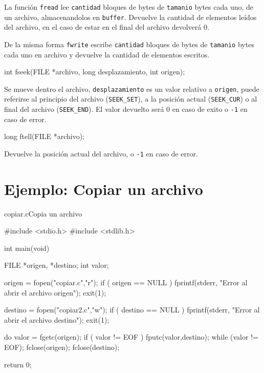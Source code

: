 La función \lstinline!fread! lee \lstinline!cantidad! bloques de bytes de
\lstinline!tamanio! bytes cada uno, de un archivo, almacenandolos en
\lstinline!buffer!. Devuelve la cantidad de elementos leídos del archivo, en
el caso de estar en el final del archivo devolverá 0.

De la misma forma \lstinline!fwrite! escribe \lstinline!cantidad! bloques de
bytes de \lstinline!tamanio! bytes cada uno en archivo y devuelve la cantidad
de elementos escritos.

\begin{codigo-c-plano}
int fseek(FILE *archivo, long desplazamiento, int origen);
\end{codigo-c-plano}

Se mueve dentro el archivo, \lstinline!desplazamiento! es un valor relativo a
\lstinline!origen!, puede referirse al principio del archivo
(\lstinline!SEEK_SET!), a la posición actual (\lstinline!SEEK_CUR!) o al final
del archivo (\lstinline!SEEK_END!). El valor devuelto será 0 en caso de exito
o \lstinline!-1! en caso de error.

\begin{codigo-c-plano}
long ftell(FILE *archivo);
\end{codigo-c-plano}

Devuelve la posición actual del archivo, o \lstinline!-1! en caso de error.

\section{Ejemplo: Copiar un archivo}

\begin{codigo}{copiar.c}{Copia un archivo}
\begin{codigo-c-plano}
#include <stdio.h>
#include <stdlib.h>

int main(void)
{
	FILE *origen, *destino;
	int  valor;

	origen = fopen("copiar.c","r");
	if ( origen == NULL ) {
		fprintf(stderr, "Error al abrir el archivo origen");
		exit(1);
	}

	destino = fopen("copiar2.c","w");
	if ( destino == NULL ) {
		fprintf(stderr, "Error al abrir el archivo destino");
		exit(1);
	}

	do {
		valor = fgetc(origen);
		if ( valor != EOF ) {
			fputc(valor,destino);
		}
	} while (valor != EOF);
	fclose(origen);
	fclose(destino);

	return 0;
}
\end{codigo-c-plano}
\end{codigo}

